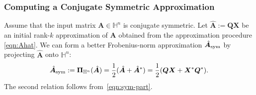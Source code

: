 \documentclass[final]{siamart1116}
\numberwithin{equation}{section}
\numberwithin{theorem}{section}
\numberwithin{figure}{section}
\newcommand{\mtx}[1]{\bm{#1}}
\begin{document}
\subsubsection{Computing a Conjugate Symmetric Approximation}
\label{sec:sym-recon}

Assume that the input matrix $\mtx{A} \in \mathbb{H}^n$ is conjugate symmetric.
Let $\hat{\mtx{A}} := \mtx{QX}$ be an initial
rank-$k$ approximation of $\mtx{A}$
obtained from the approximation procedure \cref{eqn:Ahat}.
We can form a better Frobenius-norm approximation $\hat{\mtx{A}}_{\rm sym}$
by projecting $\hat{\mtx{A}}$ onto $\mathbb{H}^n$:
\begin{equation} \label{eqn:Ahat-sym}
\hat{\mtx{A}}_{\rm sym} := \mtx{\Pi}_{\mathbb{H}^n}(\hat{\mtx{A}})
	= \frac{1}{2}(\hat{\mtx{A}} + \hat{\mtx{A}}^*)
	= \frac{1}{2}(\mtx{QX} + \mtx{X}^* \mtx{Q}^*).
\end{equation}
The second relation follows from~\cref{eqn:sym-part}.
\end{document}
